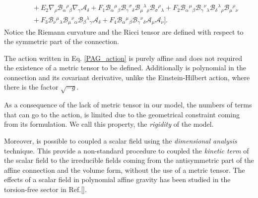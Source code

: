 \documentclass{article}
\begin{document}
\begin{equation}
\begin{split}
    \\
    &\quad
    + E_2 \nabla_\rho \mathcal{B}_{\alpha}{}^{\rho}{}_{\beta} \nabla_\gamma \mathcal{A}_\delta
    + F_1 \mathcal{B}_{\alpha}{}^{\mu}{}_{\beta} \mathcal{B}_{\gamma}{}^{\sigma}{}_{\delta} \mathcal{B}_{\mu}{}^{\lambda}{}_{\rho} \mathcal{B}_{\sigma}{}^{\rho}{}_{\lambda}
    + F_2\mathcal{B}_{\alpha}{}^{\mu}{}_{\beta} \mathcal{B}_{\gamma}{}^{\nu}{}_{\lambda} \mathcal{B}_{\delta}{}^{\lambda}{}_{\rho} \mathcal{B}_{\mu}{}^{\rho}{}_{\nu}
    \\
    &\quad
    + F_3 \mathcal{B}_{\nu}{}^{\mu}{}_{\lambda} \mathcal{B}_{\mu}{}^{\nu}{}_{\alpha} \mathcal{B}_{\beta}{}^{\lambda}{}_{\gamma} \mathcal{A}_\delta
    + F_4 \mathcal{B}_{\alpha}{}^{\mu}{}_{\beta}\mathcal{B}_{\gamma}{}^{\nu}{}_{\delta}\mathcal{A}_\mu \mathcal{A}_\nu \bigg].
    \end{split}
\end{equation}
Notice the Riemann curvature and the Ricci tensor are defined with respect to the symmetric part
of the connection.

The action written in Eq. \eqref{PAG_action} is purely affine and does not required the 
existence of a metric tensor to be defined. Additionally is polynomial in the connection
and its covariant derivative, unlike the Einstein-Hilbert action, where there is 
the factor $\sqrt{-g}$.

As a consequence of the lack of metric tensor in our model, the numbers of terms that can
go to the action, is limited due to the geometrical constraint coming from its formulation. 
We call this property, the \textit{rigidity} of the model. 

Moreover, is possible to coupled a scalar field using the \textit{dimensional analysis}
technique. This provide a non-standard procedure to coupled the \textit{kinetic term}
of the scalar field to the irreducible fields coming from the antisymmetric part
of the affine connection and the volume form, without the use of a metric tensor. 
The effects of a scalar field in polynomial affine gravity has been studied in the
torsion-free sector in Ref.[].
\end{document}
